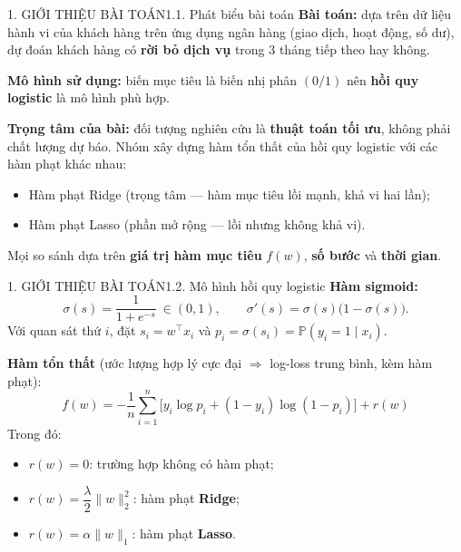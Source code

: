 \documentclass[aspectratio=169,11pt]{beamer}
\newcommand{\norm}[1]{\lVert #1 \rVert}
\begin{document}
\begin{frame}{1. GIỚI THIỆU BÀI TOÁN}{1.1. Phát biểu bài toán}
  \label{sec:1}%
  \small
  \textbf{Bài toán:} dựa trên dữ liệu hành vi của khách hàng trên ứng dụng ngân hàng
  (giao dịch, hoạt động, số dư), dự đoán khách hàng có \textbf{rời bỏ dịch vụ} trong
  3 tháng tiếp theo hay không.
  \vspace{6pt}

  \textbf{Mô hình sử dụng:} biến mục tiêu là biến nhị phân $(0/1)$ nên \textbf{hồi quy logistic}
  là mô hình phù hợp.
  \vspace{6pt}

  \textbf{Trọng tâm của bài:} đối tượng nghiên cứu là \textbf{thuật toán tối ưu}, không phải
  chất lượng dự báo. Nhóm xây dựng hàm tổn thất của hồi quy logistic với các hàm phạt khác nhau:
  \begin{itemize}
    \item Hàm phạt Ridge (trọng tâm — hàm mục tiêu lồi mạnh, khả vi hai lần);
    \item Hàm phạt Lasso (phần mở rộng — lồi nhưng không khả vi).
  \end{itemize}
  \vspace{4pt}
  Mọi so sánh dựa trên \textbf{giá trị hàm mục tiêu} $f(w)$, \textbf{số bước} và \textbf{thời gian}.
\end{frame}

\begin{frame}{1. GIỚI THIỆU BÀI TOÁN}{1.2. Mô hình hồi quy logistic}
  \small
  \textbf{Hàm sigmoid:}
  \[
    \sigma(s)=\frac{1}{1+e^{-s}}\ \in(0,1),\qquad \sigma'(s)=\sigma(s)\big(1-\sigma(s)\big).
  \]
  Với quan sát thứ $i$, đặt $s_i=w^\top x_i$ và $p_i=\sigma(s_i)=\mathbb{P}(y_i{=}1\mid x_i)$.
  \vspace{4pt}

  \textbf{Hàm tổn thất} (ước lượng hợp lý cực đại $\Rightarrow$ log-loss trung bình, kèm hàm phạt):
  \[
    f(w)=-\frac1n\sum_{i=1}^n\Big[y_i\log p_i+(1-y_i)\log(1-p_i)\Big]+r(w)
  \]
  Trong đó:
  \begin{itemize}
    \item $r(w)=0$: trường hợp không có hàm phạt;
    \item $r(w)=\dfrac{\lambda}{2}\norm{w}_2^2$: hàm phạt \textbf{Ridge};
    \item $r(w)=\alpha\norm{w}_1$: hàm phạt \textbf{Lasso}.
  \end{itemize}
\end{frame}
\end{document}

